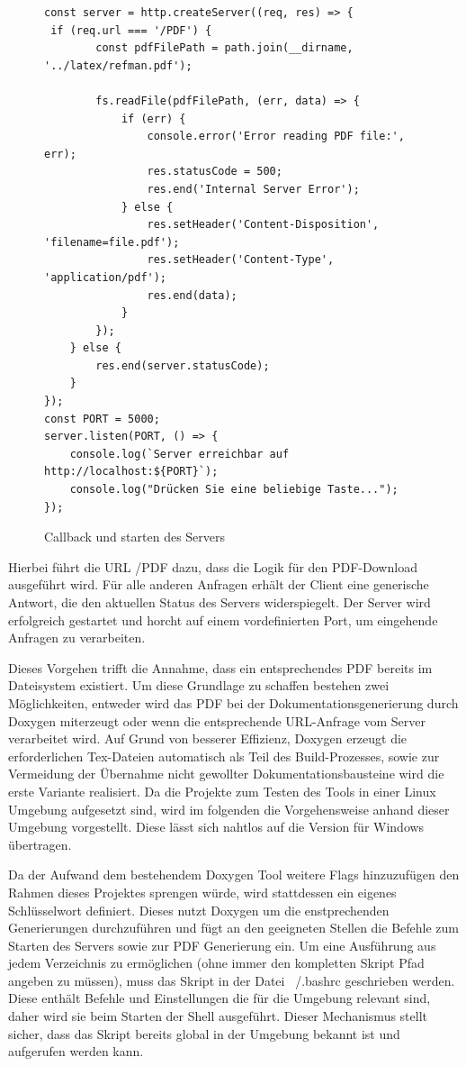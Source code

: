 \documentclass[11pt,a4paper]{report}
\begin{document}
\begin{figure}[H]
    \centering
    \begin{verbatim}
const server = http.createServer((req, res) => {
 if (req.url === '/PDF') {
        const pdfFilePath = path.join(__dirname, '../latex/refman.pdf');

        fs.readFile(pdfFilePath, (err, data) => {
            if (err) {
                console.error('Error reading PDF file:', err);
                res.statusCode = 500;
                res.end('Internal Server Error');
            } else {
                res.setHeader('Content-Disposition', 'filename=file.pdf');
                res.setHeader('Content-Type', 'application/pdf');
                res.end(data);
            }
        });
    } else {
        res.end(server.statusCode);
    }
});
const PORT = 5000;
server.listen(PORT, () => {
    console.log(`Server erreichbar auf http://localhost:${PORT}`);
    console.log("Drücken Sie eine beliebige Taste...");
});
    \end{verbatim}
    \caption{Callback und starten des Servers}
    \label{code:Callback}
\end{figure}

\noindent
Hierbei führt die URL \glqq /PDF \grqq{} dazu, dass die Logik für den PDF-Download ausgeführt wird. Für alle anderen Anfragen erhält der Client eine generische Antwort, die den aktuellen Status des Servers widerspiegelt. Der Server wird erfolgreich gestartet und horcht auf einem vordefinierten Port, um eingehende Anfragen zu verarbeiten.

\noindent
Dieses Vorgehen trifft die Annahme, dass ein entsprechendes PDF bereits im Dateisystem existiert. Um diese Grundlage zu schaffen bestehen zwei Möglichkeiten, entweder wird das PDF bei der Dokumentationsgenerierung durch Doxygen miterzeugt oder wenn die entsprechende URL-Anfrage vom Server verarbeitet wird. Auf Grund von besserer Effizienz, Doxygen erzeugt die erforderlichen \glqq Tex\grqq{}-Dateien automatisch als Teil des Build-Prozesses, sowie zur Vermeidung der Übernahme nicht gewollter Dokumentationsbausteine wird die erste Variante realisiert. Da die Projekte zum Testen des Tools in einer \glqq Linux \grqq{} Umgebung aufgesetzt sind, wird im folgenden die Vorgehensweise anhand dieser Umgebung vorgestellt. Diese lässt sich nahtlos auf die Version für \glqq Windows \grqq{} übertragen.

\noindent
Da der Aufwand dem bestehendem Doxygen Tool weitere Flags hinzuzufügen den Rahmen dieses Projektes sprengen würde, wird stattdessen ein eigenes Schlüsselwort definiert. Dieses nutzt Doxygen um die enstprechenden Generierungen durchzuführen und fügt an den geeigneten Stellen die Befehle zum Starten des Servers sowie zur PDF Generierung ein. Um eine Ausführung aus jedem Verzeichnis zu ermöglichen (ohne immer den kompletten Skript Pfad angeben zu müssen), muss das Skript in der Datei \glqq ~/.bashrc \grqq{} geschrieben werden. Diese enthält Befehle und Einstellungen die für die Umgebung relevant sind, daher wird sie beim Starten der Shell ausgeführt. Dieser Mechanismus stellt sicher, dass das Skript bereits global in der Umgebung bekannt ist und aufgerufen werden kann.
\end{document}
